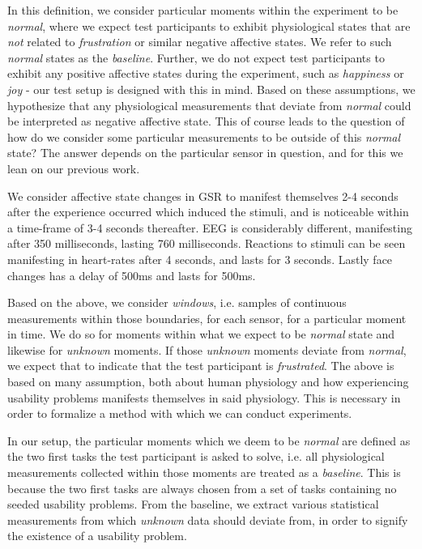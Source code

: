 In this definition, we consider particular moments within the experiment to be \textit{normal}, where we expect test
participants to exhibit physiological states that are \textit{not} related to \textit{frustration} or similar negative
affective states. We refer to such \textit{normal} states as the \textit{baseline}. Further, we do not expect test
participants to exhibit any positive affective states during the experiment, such as \textit{happiness} or \textit{joy}
- our test setup is designed with this in mind. Based on these assumptions, we hypothesize that any physiological
measurements that deviate from \textit{normal} could be interpreted as negative affective state. This of course leads to
the question of how do we consider some particular measurements to be outside of this \textit{normal} state? The answer
depends on the particular sensor in question, and for this we lean on our previous work.

We consider affective state changes in GSR to manifest themselves 2-4 seconds after the experience occurred which
induced the stimuli, and is noticeable within a time-frame of 3-4 seconds thereafter. EEG is considerably different,
manifesting after 350 milliseconds, lasting 760 milliseconds. Reactions to stimuli can be seen manifesting in heart-rates
after 4 seconds, and lasts for 3 seconds. Lastly face changes has a delay of 500ms and lasts for 500ms.

Based on the above, we consider \textit{windows}, i.e. samples of continuous measurements within those boundaries, for
each sensor, for a particular moment in time. We do so for moments within what we expect to be \textit{normal} state and
likewise for \textit{unknown} moments. If those \textit{unknown} moments deviate from \textit{normal}, we expect that to
indicate that the test participant is \textit{frustrated}. The above is based on many assumption, both about human
physiology and how experiencing usability problems manifests themselves in said physiology. This is necessary in order
to formalize a method with which we can conduct experiments.

In our setup, the particular moments which we deem to be \textit{normal} are defined as the two first tasks the test
participant is asked to solve, i.e. all physiological measurements collected within those moments are treated as a
\textit{baseline}. This is because the two first tasks are always chosen from a set of tasks containing no seeded
usability problems. From the baseline, we extract various statistical measurements from which \textit{unknown} data
should deviate from, in order to signify the existence of a usability problem.

